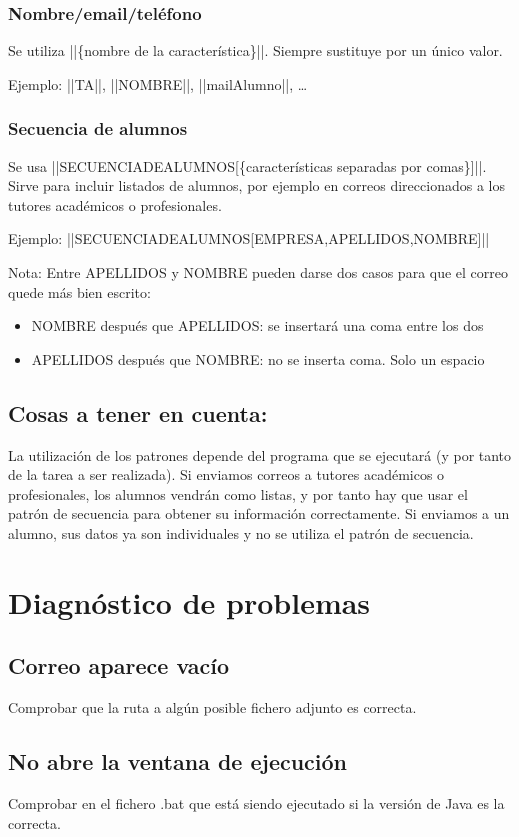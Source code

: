 \documentclass[11pt]{article}
\begin{document}
\subsubsection{Nombre/email/teléfono}
\label{sec-4-2-1}
Se utiliza ||\{nombre de la característica\}||. Siempre sustituye por un único valor.

Ejemplo: ||TA||, ||NOMBRE||, ||mailAlumno||, \ldots{}
\subsubsection{Secuencia de alumnos}
\label{sec-4-2-2}
Se usa ||SECUENCIADEALUMNOS[\{características separadas por comas\}]||. Sirve para incluir listados de alumnos, por ejemplo en correos direccionados a los tutores académicos o profesionales.

Ejemplo: ||SECUENCIADEALUMNOS[EMPRESA,APELLIDOS,NOMBRE]||

Nota: Entre APELLIDOS y NOMBRE pueden darse dos casos para que el correo quede más bien escrito:
\begin{itemize}
\item NOMBRE después que APELLIDOS: se insertará una coma entre los dos
\item APELLIDOS después que NOMBRE: no se inserta coma. Solo un espacio
\end{itemize}
\subsection{Cosas a tener en cuenta:}
\label{sec-4-3}
La utilización de los patrones depende del programa que se ejecutará (y por tanto de la tarea a ser realizada). Si enviamos correos a tutores académicos o profesionales, los alumnos vendrán como listas, y por tanto hay que usar el patrón de secuencia para obtener su información correctamente. Si enviamos a un alumno, sus datos ya son individuales y no se utiliza el patrón de secuencia.

\section{Diagnóstico de problemas}
\label{sec-5}
\subsection{Correo aparece vacío}
\label{sec-5-1}
Comprobar que la ruta a algún posible fichero adjunto es correcta.
\subsection{No abre la ventana de ejecución}
\label{sec-5-2}
Comprobar en el fichero .bat que está siendo ejecutado si la versión de Java es la correcta.
\end{document}
